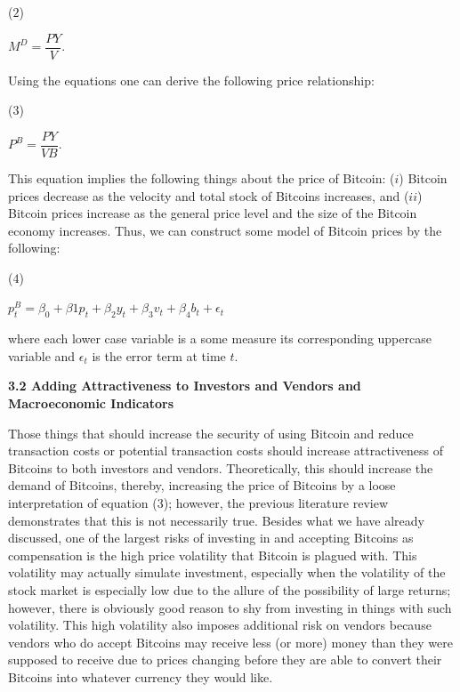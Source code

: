 \documentclass{article}[10 pt]
\newcommand{\vs}{\vspace{0.1in}}
\begin{document}
\vs

($2$) \begin{center} $M^{D} = \dfrac{PY}{V}$. \end{center}

\vs

Using the equations one can derive the following price relationship:

\vs

($3$) \begin{center} $P^{B} = \dfrac{PY}{VB}$. \end{center}

\vs

This equation implies the following things about the price of Bitcoin: ($i$)
Bitcoin prices decrease as the velocity and total stock of Bitcoins
increases, and ($ii$) Bitcoin prices increase as the general price level and
the size of the Bitcoin economy increases. Thus, we can construct some model
of Bitcoin prices by the following:

\vs

($4$) \begin{center} $p_{t}^{B} = \beta_{0} + \beta{1}p_t + \beta_{2}y_t +
    \beta_{3}v_t + \beta_{4}b_t + \epsilon_t$ \end{center}

where each lower case variable is a some measure its corresponding uppercase
variable and $\epsilon_t$ is the error term at time $t$.

\vs

\textbf{3.2 Adding Attractiveness to Investors and Vendors and Macroeconomic
Indicators}

\vs

Those things that should increase the security of using Bitcoin and reduce
transaction costs or potential transaction costs should increase
attractiveness of Bitcoins to both investors and vendors. Theoretically,
this should increase the demand of Bitcoins, thereby, increasing the price
of Bitcoins by a loose interpretation of equation ($3$); however, the
previous literature review demonstrates that this is not necessarily true.
Besides what we have already discussed, one of the largest risks of
investing in and accepting Bitcoins as compensation is the high price
volatility that Bitcoin is plagued with. This volatility may actually
simulate investment, especially when the volatility of the stock market is
especially low due to the allure of the possibility of large returns;
however, there is obviously good reason to shy from investing in things with
such volatility. This high volatility also imposes additional risk on
vendors because vendors who do accept Bitcoins may receive less (or more) money than
they were supposed to receive due to prices changing before they are able to convert their Bitcoins
into whatever currency they would like.
\end{document}
